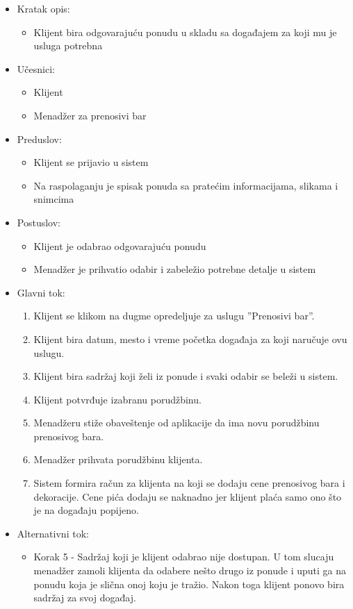 \documentclass[a4paper]{article}
\begin{document}
\begin{itemize}
    \item Kratak opis:
        \begin{itemize}
            \item Klijent bira odgovarajuću ponudu u skladu sa događajem za koji mu je usluga potrebna
        \end{itemize}
    \item Učesnici:
        \begin{itemize}
            \item Klijent
            \item Menadžer za prenosivi bar
        \end{itemize}
    \item Preduslov:
        \begin{itemize}
            \item Klijent se prijavio u sistem
		    \item Na raspolaganju je spisak ponuda sa pratećim informacijama, slikama i snimcima
        \end{itemize}
    \item Postuslov:
        \begin{itemize}
            \item Klijent je odabrao odgovarajuću ponudu
            \item Menadžer je prihvatio odabir i zabeležio potrebne detalje u sistem
        \end{itemize}
    \item Glavni tok:
        \begin{enumerate}
          \item  Klijent se klikom na dugme opredeljuje za uslugu ''Prenosivi bar''.
        \item Klijent bira datum, mesto i vreme početka događaja za koji naručuje ovu uslugu.
        \item Klijent bira sadržaj koji želi iz ponude i svaki odabir se beleži u sistem.
        \item Klijent potvrđuje izabranu porudžbinu.
        \item Menadžeru stiže obaveštenje od aplikacije da ima novu porudžbinu prenosivog bara.
        \item Menadžer prihvata porudžbinu klijenta.
        \item Sistem formira račun za klijenta na koji se dodaju cene prenosivog bara i dekoracije. Cene pića dodaju se naknadno jer klijent plaća samo ono što je na događaju popijeno.
        \end{enumerate}
        \item Alternativni tok:
        \begin{itemize}
            \item Korak 5 - Sadržaj koji je klijent odabrao nije dostupan. U tom slucaju menadžer zamoli klijenta da odabere nešto drugo iz ponude i uputi ga na ponudu koja je slična onoj koju je tražio. Nakon toga klijent ponovo bira sadržaj za svoj događaj.
        \end{itemize}    
    \end{itemize}
\end{document}
